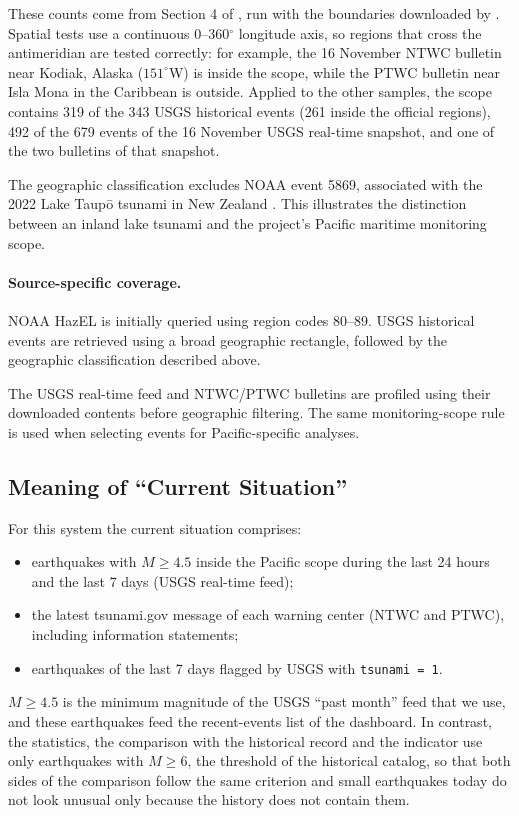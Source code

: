 \documentclass[a4paper,11pt,oneside]{book}
\begin{document}
These counts come from Section 4 of , run with the boundaries downloaded by .
Spatial tests use a continuous 0--360$^\circ$ longitude axis, so regions that cross the antimeridian are tested correctly: for example, the 16 November NTWC bulletin near Kodiak, Alaska ($151^\circ$W) is inside the scope, while the PTWC bulletin near Isla Mona in the Caribbean is outside.
Applied to the other samples, the scope contains 319 of the 343 USGS historical events (261 inside the official regions), 492 of the 679 events of the 16 November USGS real-time snapshot, and one of the two bulletins of that snapshot.

The geographic classification excludes NOAA event 5869, associated
with the 2022 Lake Taup\={o} tsunami in New Zealand \cite{taupo}.
This illustrates the distinction between an inland lake tsunami
and the project's Pacific maritime monitoring scope.

\paragraph{Source-specific coverage.}

NOAA HazEL is initially queried using region codes 80--89.
USGS historical events are retrieved using a broad geographic
rectangle, followed by the geographic classification described
above.

The USGS real-time feed and NTWC/PTWC bulletins are profiled
using their downloaded contents before geographic filtering.
The same monitoring-scope rule is used when selecting events
for Pacific-specific analyses.

\subsection{Meaning of ``Current Situation''}
For this system the current situation comprises:
\begin{itemize}[nosep]
  \item earthquakes with $M \geq 4.5$ inside the Pacific scope during the last 24 hours and the last 7 days (USGS real-time feed);
  \item the latest tsunami.gov message of each warning center (NTWC and PTWC), including information statements;
  \item earthquakes of the last 7 days flagged by USGS with \texttt{tsunami = 1}.
\end{itemize}
$M \geq 4.5$ is the minimum magnitude of the USGS ``past month'' feed that we use, and these earthquakes feed the recent-events list of the dashboard.
In contrast, the statistics, the comparison with the historical record and the indicator use only earthquakes with $M \geq 6$, the threshold of the historical catalog, so that both sides of the comparison follow the same criterion and small earthquakes today do not look unusual only because the history does not contain them.
\end{document}

